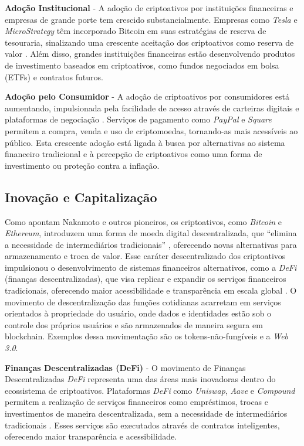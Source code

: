 \documentclass[article,12pt,oneside,a4paper,english,brazil]{unifil}
\begin{document}
\begin{Spacing}{1.5}
\textbf{Adoção Institucional} - A adoção de criptoativos por instituições financeiras e empresas de grande porte tem crescido substancialmente. Empresas como \textit{Tesla} e \textit{MicroStrategy} têm incorporado Bitcoin em suas estratégias de reserva de tesouraria, sinalizando uma crescente aceitação dos criptoativos como reserva de valor \cite{bouri2017hedge}. Além disso, grandes instituições financeiras estão desenvolvendo produtos de investimento baseados em criptoativos, como fundos negociados em bolsa (ETFs) e contratos futuros.

\textbf{Adoção pelo Consumidor} - A adoção de criptoativos por consumidores está aumentando, impulsionada pela facilidade de acesso através de carteiras digitais e plataformas de negociação \cite{kondor2014do}. Serviços de pagamento como \textit{PayPal} e \textit{Square} permitem a compra, venda e uso de criptomoedas, tornando-as mais acessíveis ao público. Esta crescente adoção está ligada à busca por alternativas ao sistema financeiro tradicional e à percepção de criptoativos como uma forma de investimento ou proteção contra a inflação.

\subsection*{Inovação e Capitalização}

Como apontam Nakamoto e outros pioneiros, os criptoativos, como \textit{Bitcoin} e \textit{Ethereum}, introduzem uma forma de moeda digital descentralizada, que ``elimina a necessidade de intermediários tradicionais'' \cite{nakamoto2008bitcoin}, oferecendo novas alternativas para armazenamento e troca de valor. Esse caráter descentralizado dos criptoativos impulsionou o desenvolvimento de sistemas financeiros alternativos, como a \textit{DeFi} (finanças descentralizadas), que visa replicar e expandir os serviços financeiros tradicionais, oferecendo maior acessibilidade e transparência em escala global \cite{schar2021defi}. O movimento de descentralização das funções cotidianas acarretam em serviços orientados à propriedade do usuário, onde dados e identidades estão sob o controle dos próprios usuários e são armazenados de maneira segura em blockchain. Exemplos dessa movimentação são os tokens-não-fungíveis e a \textit{Web 3.0}.

\textbf{Finanças Descentralizadas (DeFi)} - O movimento de Finanças Descentralizadas \textit{DeFi} representa uma das áreas mais inovadoras dentro do ecossistema de criptoativos. Plataformas \textit{DeFi} como \textit{Uniswap}, \textit{Aave} e \textit{Compound} permitem a realização de serviços financeiros como empréstimos, trocas e investimentos de maneira descentralizada, sem a necessidade de intermediários tradicionais \cite{zhang2020data}. Esses serviços são executados através de contratos inteligentes, oferecendo maior transparência e acessibilidade.


\end{Spacing}
\end{document}
